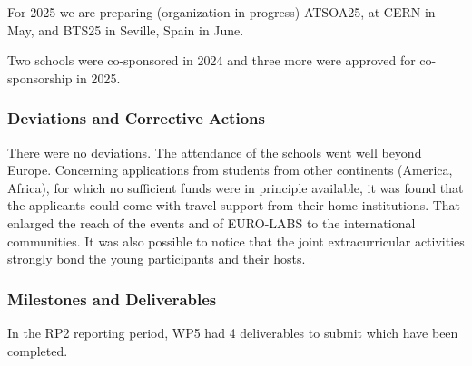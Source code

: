 For 2025 we are preparing
(organization in progress)
ATSOA25, at CERN in May, and
BTS25 in Seville, Spain in June.

Two schools were co-sponsored in 2024 and three more were approved for co-sponsorship in 2025.

\subsubsection*{Deviations and Corrective Actions}
\label{sec:wp5_deviations}
There were no deviations. The attendance of the schools went well beyond Europe.
Concerning applications from students from other continents (America, Africa), for which 
no sufficient funds were in principle available, %
it was found 
that the applicants could come with travel support from their home institutions. That enlarged the reach of the events and of EURO-LABS to the international communities. 
It was also possible to notice that the joint extracurricular activities strongly bond the young participants and their hosts.
\subsubsection*{Milestones and Deliverables}
In the RP2 reporting period, WP5 had 4 deliverables to submit which have been completed.

